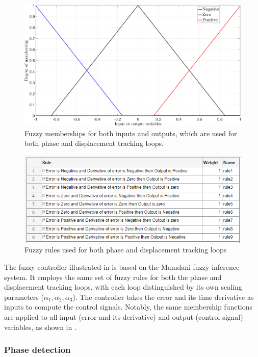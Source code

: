 \documentclass[lettersize,journal]{IEEEtran}
\begin{document}
\begin{figure}
    \centering    \includegraphics[width=\linewidth]{F_membership.png}
    \caption{Fuzzy memberships for both inputs and outputs, which are used for both phase and displacement tracking loops.}
    \label{F_fuzzy_memberships}
\end{figure}


\begin{figure}
    \centering    \includegraphics[width=\linewidth]{Fuzzy_rules.png}
    \caption{Fuzzy rules used for both phase and displacement tracking loops}
    \label{F_fuzzy_rules}
\end{figure}

The fuzzy controller illustrated in  is based on the Mamdani fuzzy inference system. It employs the same set of fuzzy rules for both the phase and displacement tracking loops, with each loop distinguished by its own scaling parameters ($\alpha_1, \alpha_2, \alpha_3$). The controller takes the error and its time derivative as inputs to compute the control signals. Notably, the same membership functions are applied to all input (error and its derivative) and output (control signal) variables, as shown in .



\subsubsection{Phase detection} \label{S_phase_detection}
\end{document}

